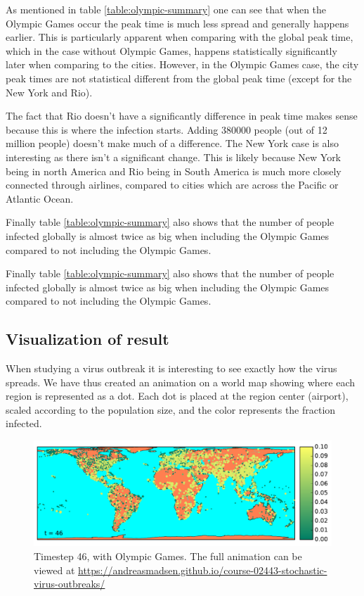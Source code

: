 As mentioned in table \ref{table:olympic-summary} one can see that when the Olympic Games occur the peak time is much less spread and generally happens earlier. This is particularly apparent when comparing with the global peak time, which in the case without Olympic Games, happens statistically significantly later when comparing to the cities. However, in the Olympic Games case, the city peak times are not statistical different from the global peak time (except for the New York and Rio).

The fact that Rio doesn't have a significantly difference in peak time makes sense because this is where the infection starts. Adding 380000 people (out of 12 million people) doesn't make much of a difference. The New York case is also interesting as there isn't a significant change. This is likely because New York being in north America and Rio being in South America is much more closely connected through airlines, compared to cities which are across the Pacific or Atlantic Ocean.

Finally table \ref{table:olympic-summary} also shows that the number of people infected globally is almost twice as big when including the Olympic Games compared to not including the Olympic Games.

Finally table \ref{table:olympic-summary} also shows that the number of people infected globally is almost twice as big when including the Olympic Games compared to not including the Olympic Games.

\subsection{Visualization of result}
When studying a virus outbreak it is interesting to see exactly how the virus spreads. We have thus created an animation on a world map showing where each region is represented as a dot. Each dot is placed at the region center (airport), scaled according to the population size, and the color represents the fraction infected.

\begin{figure}[H]
	\centering
	\includegraphics[width=1.0 \linewidth]{plots/gifs/frames/rio-46}
	\caption{Timestep 46, with Olympic Games. The full animation can be viewed at
		\url{https://andreasmadsen.github.io/course-02443-stochastic-virus-outbreaks/}}
	\label{fig:rio-46}
\end{figure}

